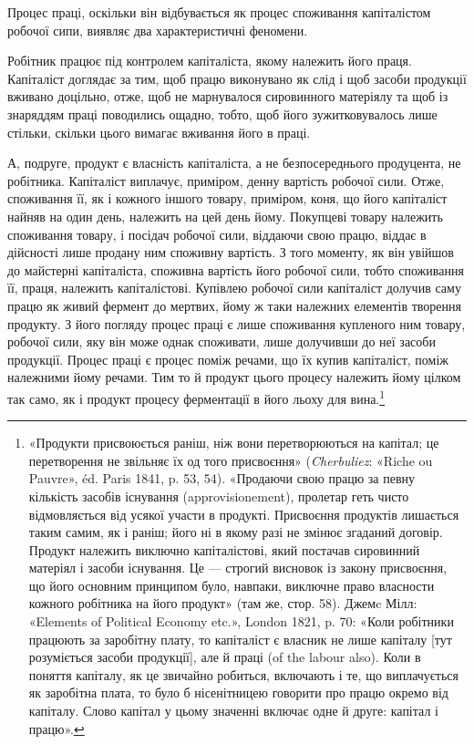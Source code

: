 Процес праці, оскільки він відбувається як процес споживання
капіталістом робочої сипи, виявляє два характеристичні феномени.

Робітник працює під контролем капіталіста, якому належить
його праця. Капіталіст доглядає за тим, щоб працю виконувано
як слід і щоб засоби продукції вживано доцільно, отже, щоб не
марнувалося сировинного матеріялу та щоб із знаряддям праці
поводились ощадно, тобто, щоб його зужитковувалось лише
стільки, скільки цього вимагає вживання його в праці.

А, подруге, продукт є власність капіталіста, а не безпосереднього
продуцента, не робітника. Капіталіст виплачує, приміром,
денну вартість робочої сили. Отже, споживання її, як і кожного
іншого товару, приміром, коня, що його капіталіст найняв на
один день, належить на цей день йому. Покупцеві товару належить
споживання товару, і посідач робочої сили, віддаючи свою
працю, віддає в дійсності лише продану ним споживну вартість.
З того моменту, як він увійшов до майстерні капіталіста, споживна
вартість його робочої сили, тобто споживання її, праця, належить
капіталістові. Купівлею робочої сили капіталіст долучив саму
працю як живий фермент до мертвих, йому ж таки належних
елементів творення продукту. З його погляду процес праці є
лише споживання купленого ним товару, робочої сили, яку він
може однак споживати, лише долучивши до неї засоби продукції.
Процес праці є процес поміж речами, що їх купив капіталіст,
поміж належними йому речами. Тим то й продукт цього процесу
належить йому цілком так само, як і продукт процесу ферментації
в його льоху для вина.\footnote{
«Продукти присвоюється раніш, ніж вони перетворюються на
капітал; це перетворення не звільняє їх од того присвоєння» (\emph{Cherbuliez}:
«Riche ou Pauvre», éd. Paris 1841, p. 53, 54). «Продаючи свою
працю за певну кількість засобів існування (approvisionement), пролетар
геть чисто відмовляється від усякої участи в продукті. Присвоєння продуктів
лишається таким самим, як і раніш; його ні в якому разі не змінює
згаданий договір. Продукт належить виключно капіталістові, який постачав
сировинний матеріял і засоби існування. Це — строгий висновок
із закону присвоєння, що його основним принципом було, навпаки, виключне
право власности кожного робітника на його продукт» (там же,
стор. 58). Джемc Мілл: «Elements of Political Economy etc.», London
1821, p. 70: «Коли робітники працюють за заробітну плату, то капіталіст
є власник не лише капіталу [тут розуміється засоби продукції], але
й праці (of the labour also). Коли в поняття капіталу, як це звичайно
робиться, включають і те, що виплачується як заробітна плата, то було б
нісенітницею говорити про працю окремо від капіталу. Слово капітал у
цьому значенні включає одне й друге: капітал і працю».
}

